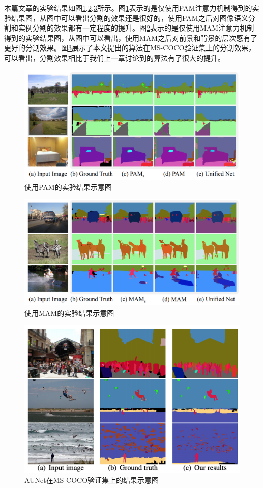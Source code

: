\documentclass[cn]{elegantbook}
\begin{document}
本篇文章的实验结果如图\ref{aunetres1},\ref{aunetres2},\ref{aunetres3}所示。图\ref{aunetres1}表示的是仅使用PAM注意力机制得到的实验结果图，从图中可以看出分割的效果还是很好的，使用PAM之后对图像语义分割和实例分割的效果都有一定程度的提升。图\ref{aunetres2}表示的是仅使用MAM注意力机制得到的实验结果图，从图中可以看出，使用MAM之后对前景和背景的层次感有了更好的分割效果。图\ref{aunetres3}展示了本文提出的算法在MS-COCO验证集上的分割效果，可以看出，分割效果相比于我们上一章讨论到的算法有了很大的提升。
\begin{figure}[!h]
	\centering
	\includegraphics[width=\textwidth]{images/aunetres1}
	\caption{\label{aunetres1}使用PAM的实验结果示意图}
\end{figure}
\begin{figure}[!h]
	\centering
	\includegraphics[width=\textwidth]{images/aunetres2}
	\caption{\label{aunetres2}使用MAM的实验结果示意图}
\end{figure}
\begin{figure}[!h]
	\centering
	\includegraphics[width=\textwidth]{images/aunetres3}
	\caption{\label{aunetres3}AUNet在MS-COCO验证集上的结果示意图}
\end{figure}
\end{document}
